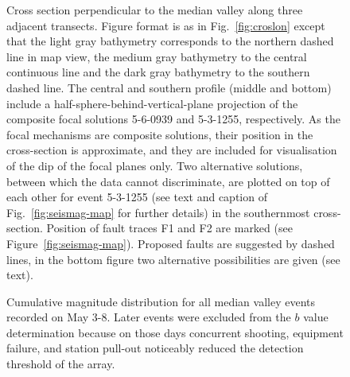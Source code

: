 \documentclass[jgr]{aguplus}
\newlength{\tw}
\begin{document}
\begin{figure}




\caption{Cross section perpendicular to the median valley along three
adjacent transects.  Figure format is as in
Fig.~\protect\ref{fig:croslon} except that the light gray bathymetry
corresponds to  the northern dashed line in map view,
the medium gray bathymetry  to the central continuous line and the
dark gray bathymetry to the southern dashed line. The central and
southern profile (middle and bottom) include a
half-sphere-behind-vertical-plane projection of the
composite focal solutions 5-6-0939 and 5-3-1255, respectively. As the
focal mechanisms are composite solutions, their position in the
cross-section is approximate, and they are included for
visualisation of the dip of the focal planes only. Two alternative
solutions, between which the data cannot discriminate, are plotted on
top of each other for
event 5-3-1255 (see text and caption of
Fig.~\protect\ref{fig:seismag-map} for further details) in the
southernmost cross-section.
Position of fault traces  F1 and F2 are marked (see Figure~\protect\ref{fig:seismag-map}).
Proposed faults are suggested by dashed lines, in the bottom figure two alternative possibilities are given
 (see text).}

\label{fig:croslat}
\end{figure}

\begin{figure}

\caption{Cumulative magnitude distribution for all median valley events recorded on
May 3-8.  Later events were excluded from the $b$ value
determination because on those days concurrent shooting, equipment
failure, and station pull-out noticeably  reduced the detection
threshold of the array.   }
\label{fig:magnitude}
\end{figure}
\end{document}
